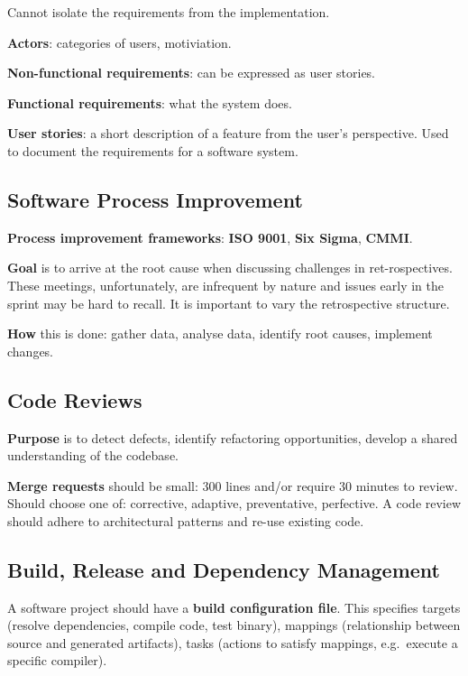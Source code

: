 \documentclass{article}
\begin{document}
\noindent Cannot isolate the requirements from the implementation.

\noindent \textbf{Actors}: categories of users, motiviation.

\noindent \textbf{Non-functional requirements}: can be expressed as user stories.

\noindent \textbf{Functional requirements}: what the system does.

\noindent \textbf{User stories}: a short description of a feature from the user's perspective. Used to document the requirements for a software system.


\subsection*{Software Process Improvement}

\noindent \textbf{Process improvement frameworks}: \textbf{ISO 9001}, \textbf{Six Sigma}, \textbf{CMMI}.

\noindent \textbf{Goal} is to arrive at the root cause when discussing challenges in ret-rospectives. 
These meetings, unfortunately, are infrequent by nature and issues early in the sprint may be hard to recall. 
It is important to vary the retrospective structure.

\noindent \textbf{How} this is done: gather data, analyse data, identify root causes, implement changes.


\subsection*{Code Reviews}

\noindent \textbf{Purpose} is to detect defects, identify refactoring opportunities, develop a shared understanding of the codebase.

\noindent \textbf{Merge requests} should be small: 300 lines and/or require 30 minutes to review.
Should choose one of: corrective, adaptive, preventative, perfective.
A code review should adhere to architectural patterns and re-use existing code.


\subsection*{Build, Release and Dependency Management}

\noindent A software project should have a \textbf{build configuration file}. This specifies targets (resolve dependencies, compile code, test binary),
mappings (relationship between source and generated artifacts), tasks (actions to satisfy mappings, e.g.\ execute a specific compiler).
\end{document}
